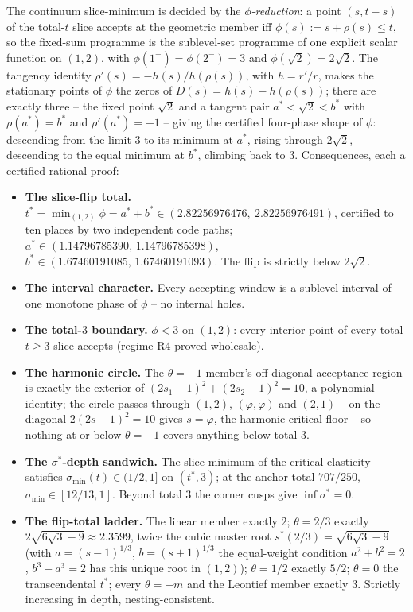 \documentclass[preprint,11pt,authoryear]{elsarticle}
\theoremstyle{remark}
\begin{document}
The continuum slice-minimum is decided by the \emph{$\phi$-reduction}: a point $(s,t-s)$ of the total-$t$ slice accepts at the geometric member iff $\phi(s):=s+\rho(s)\le t$, so the fixed-sum programme is the sublevel-set programme of one explicit scalar function on $(1,2)$, with $\phi(1^+)=\phi(2^-)=3$ and $\phi(\sqrt2)=2\sqrt2$. The tangency identity $\rho'(s)=-h(s)/h(\rho(s))$, with $h=r'/r$, makes the stationary points of $\phi$ the zeros of $D(s)=h(s)-h(\rho(s))$; there are exactly three -- the fixed point $\sqrt2$ and a tangent pair $a^*<\sqrt2<b^*$ with $\rho(a^*)=b^*$ and $\rho'(a^*)=-1$ -- giving the certified four-phase shape of $\phi$: descending from the limit $3$ to its minimum at $a^*$, rising through $2\sqrt2$, descending to the equal minimum at $b^*$, climbing back to $3$. Consequences, each a certified rational proof:
\begin{itemize}[leftmargin=2em]
\item \textbf{The slice-flip total.} $t^*=\min_{(1,2)}\phi=a^*+b^*\in(2.82256976476,\ 2.82256976491)$, certified to ten places by two independent code paths; $a^*\in(1.14796785390,\,1.14796785398)$, $b^*\in(1.67460191085,\,1.67460191093)$. The flip is strictly below $2\sqrt2$.
\item \textbf{The interval character.} Every accepting window is a sublevel interval of one monotone phase of $\phi$ -- no internal holes.
\item \textbf{The total-$3$ boundary.} $\phi<3$ on $(1,2)$: every interior point of every total-$t\ge3$ slice accepts (regime R4 proved wholesale).
\item \textbf{The harmonic circle.} The $\theta=-1$ member's off-diagonal acceptance region is exactly the exterior of $(2s_1-1)^2+(2s_2-1)^2=10$, a polynomial identity; the circle passes through $(1,2)$, $(\varphi,\varphi)$ and $(2,1)$ -- on the diagonal $2(2s-1)^2=10$ gives $s=\varphi$, the harmonic critical floor -- so nothing at or below $\theta=-1$ covers anything below total $3$.
\item \textbf{The $\sigma^*$-depth sandwich.} The slice-minimum of the critical elasticity satisfies $\sigma_{\min}(t)\in(1/2,1]$ on $(t^*,3)$; at the anchor total $707/250$, $\sigma_{\min}\in[12/13,1]$. Beyond total $3$ the corner cusps give $\inf\sigma^*=0$.
\item \textbf{The flip-total ladder.} The linear member exactly $2$; $\theta=2/3$ exactly $2\sqrt{6\sqrt3-9}\approx2.3599$, twice the cubic master root $s^*(2/3)=\sqrt{6\sqrt3-9}$ (with $a=(s-1)^{1/3}$, $b=(s+1)^{1/3}$ the equal-weight condition $a^2+b^2=2$, $b^3-a^3=2$ has this unique root in $(1,2)$); $\theta=1/2$ exactly $5/2$; $\theta=0$ the transcendental $t^*$; every $\theta=-m$ and the Leontief member exactly $3$. Strictly increasing in depth, nesting-consistent.
\end{itemize}
\end{document}
